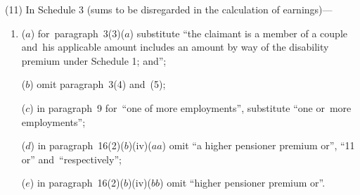 \documentclass[12pt,a4paper]{article}
\begin{document}
(11) In Schedule 3 (sums to be disregarded in the calculation of earnings)—
\begin{enumerate}\item[]
($a$) for~paragraph~3(3)($a$)  substitute “the claimant is a member of a couple and~his applicable amount includes an amount by way of the disability premium under Schedule 1; and”;

($b$) omit paragraph~3(4) and~(5);

($c$) in paragraph~9 for~“one of more employments”, substitute “one or~more employments”;

($d$) in paragraph~16(2)($b$)(iv)($aa$)  omit “a higher pensioner premium or”, “11 or” and~“respectively”;

($e$) in paragraph~16(2)($b$)(iv)($bb$)  omit “higher pensioner premium or”.
\end{enumerate}
\end{document}
